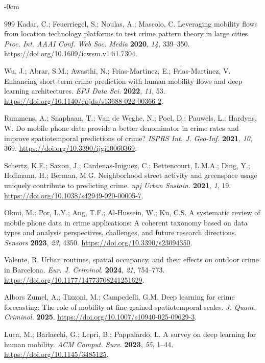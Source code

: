 \documentclass[applsci,article,submit,moreauthors]{Definitions/mdpi}
\begin{document}
\begin{adjustwidth}{-\extralength}{0cm}
\begin{thebibliography}{999}
Kadar, C.; Feuerriegel, S.; Noulas, A.; Mascolo, C. Leveraging mobility
flows from location technology platforms to test crime pattern theory in
large cities. \emph{Proc. Int. AAAI Conf. Web Soc. Media} \textbf{2020},
\emph{14}, 339--350.
\url{https://doi.org/10.1609/icwsm.v14i1.7304}.

Wu, J.; Abrar, S.M.; Awasthi, N.; Frias-Martinez, E.; Frias-Martinez, V.
Enhancing short-term crime prediction with human mobility flows and deep
learning architectures. \emph{EPJ Data Sci.} \textbf{2022}, \emph{11}, 53.
\url{https://doi.org/10.1140/epjds/s13688-022-00366-2}.

Rummens, A.; Snaphaan, T.; Van de Weghe, N.; Poel, D.; Pauwels, L.; Hardyns, W. Do mobile phone data provide a better denominator in crime rates and improve spatiotemporal predictions of crime? \emph{ISPRS Int. J. Geo-Inf.} \textbf{2021}, \emph{10}, 369. \url{https://doi.org/10.3390/ijgi10060369}.

Schertz, K.E.; Saxon, J.; Cardenas-Iniguez, C.; Bettencourt, L.M.A.; Ding, Y.; Hoffmann, H.; Berman, M.G. Neighborhood street activity and greenspace usage uniquely contribute to predicting crime. \emph{npj Urban Sustain.} \textbf{2021}, \emph{1}, 19. \url{https://doi.org/10.1038/s42949-020-00005-7}.

Okmi, M.; Por, L.Y.; Ang, T.F.; Al-Hussein, W.; Ku, C.S. A systematic review of mobile phone data in crime applications: A coherent taxonomy based on data types and analysis perspectives, challenges, and future research directions. \emph{Sensors} \textbf{2023}, \emph{23}, 4350. \url{https://doi.org/10.3390/s23094350}.

Valente, R. Urban routines, spatial occupancy, and their effects on outdoor crime in Barcelona. \emph{Eur. J. Criminol.} \textbf{2024}, \emph{21}, 754--773. \url{https://doi.org/10.1177/14773708241251629}.

Albors Zumel, A.; Tizzoni, M.; Campedelli, G.M. Deep learning for crime forecasting: The role of mobility at fine-grained spatiotemporal scales. \emph{J. Quant. Criminol.} \textbf{2025}. \url{https://doi.org/10.1007/s10940-025-09629-3}.

Luca, M.; Barlacchi, G.; Lepri, B.; Pappalardo, L. A survey on deep learning for human mobility. \emph{ACM Comput. Surv.} \textbf{2023}, \emph{55}, 1--44. \url{https://doi.org/10.1145/3485125}.


\end{thebibliography}
\end{adjustwidth}
\end{document}
